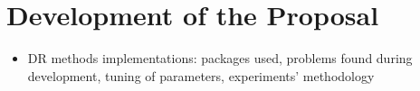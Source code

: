 \section{Development of the Proposal}

\begin{itemize}
    \item DR methods implementations: packages used, problems found during development, tuning of parameters, experiments' methodology
\end{itemize}